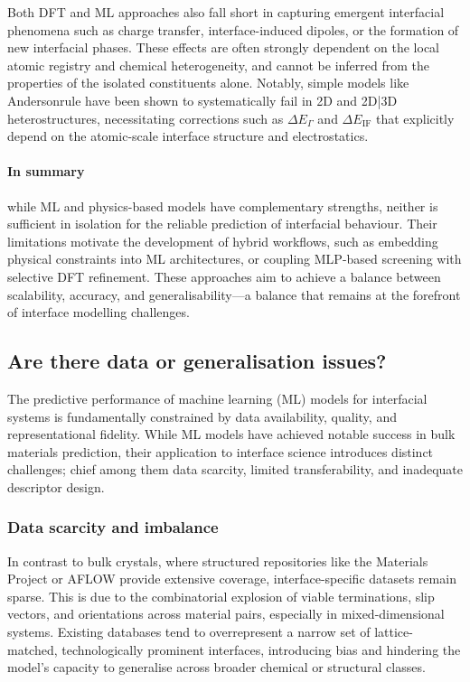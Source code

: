 Both DFT and ML approaches also fall short in capturing emergent interfacial phenomena such as charge transfer, interface-induced dipoles, or the formation of new interfacial phases. These effects are often strongly dependent on the local atomic registry and chemical heterogeneity, and cannot be inferred from the properties of the isolated constituents alone. Notably, simple models like Anderson\rqss rule have been shown to systematically fail in 2D and 2D|3D heterostructures, necessitating corrections such as $\Delta E_\Gamma$ and $\Delta E_\mathrm{IF}$ that explicitly depend on the atomic-scale interface structure and electrostatics.

\paragraph{In summary} while ML and physics-based models have complementary strengths, neither is sufficient in isolation for the reliable prediction of interfacial behaviour. Their limitations motivate the development of hybrid workflows, such as embedding physical constraints into ML architectures, or coupling MLP-based screening with selective DFT refinement. These approaches aim to achieve a balance between scalability, accuracy, and generalisability---a balance that remains at the forefront of interface modelling challenges.

\subsection{Are there data or generalisation issues?}

The predictive performance of machine learning (ML) models for interfacial systems is fundamentally constrained by data availability, quality, and representational fidelity. While ML models have achieved notable success in bulk materials prediction, their application to interface science introduces distinct challenges; chief among them data scarcity, limited transferability, and inadequate descriptor design.

\subsubsection{Data scarcity and imbalance}

In contrast to bulk crystals, where structured repositories like the Materials Project or AFLOW provide extensive coverage, interface-specific datasets remain sparse. This is due to the combinatorial explosion of viable terminations, slip vectors, and orientations across material pairs, especially in mixed-dimensional systems. Existing databases tend to overrepresent a narrow set of lattice-matched, technologically prominent interfaces, introducing bias and hindering the model's capacity to generalise across broader chemical or structural classes.

